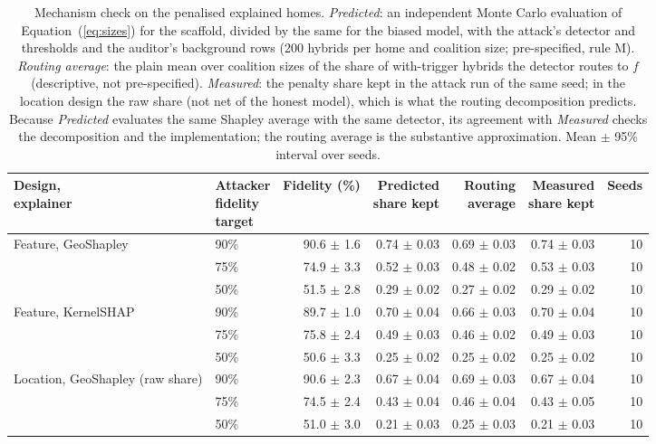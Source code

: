 \begin{table}[t]
\centering
\footnotesize
\setlength{\tabcolsep}{3.5pt}
\begin{adjustbox}{max width=\linewidth}
\begin{tabular}{llrrrrr}
\toprule
\makecell[b]{Design, \\ explainer} & \makecell[b]{Attacker \\ fidelity \\ target} & Fidelity (\%) & \makecell[b]{Predicted \\ share kept} & \makecell[b]{Routing \\ average} & \makecell[b]{Measured \\ share kept} & Seeds \\
\midrule
Feature, GeoShapley & 90\% & 90.6 $\pm$ 1.6 & 0.74 $\pm$ 0.03 & 0.69 $\pm$ 0.03 & 0.74 $\pm$ 0.03 & 10 \\
 & 75\% & 74.9 $\pm$ 3.3 & 0.52 $\pm$ 0.03 & 0.48 $\pm$ 0.02 & 0.53 $\pm$ 0.03 & 10 \\
 & 50\% & 51.5 $\pm$ 2.8 & 0.29 $\pm$ 0.02 & 0.27 $\pm$ 0.02 & 0.29 $\pm$ 0.02 & 10 \\
\midrule
Feature, KernelSHAP & 90\% & 89.7 $\pm$ 1.0 & 0.70 $\pm$ 0.04 & 0.66 $\pm$ 0.03 & 0.70 $\pm$ 0.04 & 10 \\
 & 75\% & 75.8 $\pm$ 2.4 & 0.49 $\pm$ 0.03 & 0.46 $\pm$ 0.02 & 0.49 $\pm$ 0.03 & 10 \\
 & 50\% & 50.6 $\pm$ 3.3 & 0.25 $\pm$ 0.02 & 0.25 $\pm$ 0.02 & 0.25 $\pm$ 0.02 & 10 \\
\midrule
Location, GeoShapley (raw share) & 90\% & 90.6 $\pm$ 2.3 & 0.67 $\pm$ 0.04 & 0.69 $\pm$ 0.03 & 0.67 $\pm$ 0.04 & 10 \\
 & 75\% & 74.5 $\pm$ 2.4 & 0.43 $\pm$ 0.04 & 0.46 $\pm$ 0.04 & 0.43 $\pm$ 0.05 & 10 \\
 & 50\% & 51.0 $\pm$ 3.0 & 0.21 $\pm$ 0.03 & 0.25 $\pm$ 0.03 & 0.21 $\pm$ 0.03 & 10 \\
\bottomrule
\end{tabular}
\end{adjustbox}
\caption{Mechanism check on the penalised explained homes. \emph{Predicted}: an independent Monte Carlo evaluation of Equation~(\ref{eq:sizes}) for the scaffold, divided by the same for the biased model, with the attack's detector and thresholds and the auditor's background rows (200 hybrids per home and coalition size; pre-specified, rule M). \emph{Routing average}: the plain mean over coalition sizes of the share of with-trigger hybrids the detector routes to $f$ (descriptive, not pre-specified). \emph{Measured}: the penalty share kept in the attack run of the same seed; in the location design the raw share (not net of the honest model), which is what the routing decomposition predicts. Because \emph{Predicted} evaluates the same Shapley average with the same detector, its agreement with \emph{Measured} checks the decomposition and the implementation; the routing average is the substantive approximation. Mean $\pm$ 95\% interval over seeds.}
\label{tab:mechanism}
\end{table}
